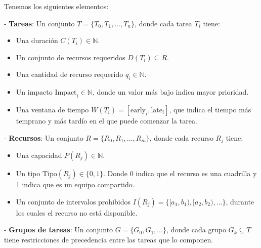 \documentclass{article}
\begin{document}
Tenemos los siguientes elementos:

- \textbf{Tareas}: Un conjunto \( T = \{T_0, T_1, \dots, T_n\} \), donde cada tarea \( T_i \) tiene:
  \begin{itemize}
    \item Una duración \( C(T_i) \in \mathbb{N} \).
    \item Un conjunto de recursos requeridos \( D(T_i) \subseteq R \).
    \item Una cantidad de recurso requerido \( q_i \in \mathbb{N} \).
    \item Un impacto \( \text{Impact}_i \in \mathbb{N} \), donde un valor más bajo indica mayor prioridad.
    \item Una ventana de tiempo \( W(T_i) = [\text{early}_i, \text{late}_i] \), que indica el tiempo más temprano y más tardío en el que puede comenzar la tarea.
  \end{itemize}

- \textbf{Recursos}: Un conjunto \( R = \{R_0, R_1, \dots, R_m\} \), donde cada recurso \( R_j \) tiene:
  \begin{itemize}
    \item Una capacidad \( P(R_j) \in \mathbb{N} \).
    \item Un tipo \( \text{Tipo}(R_j) \in \{0, 1\} \). Donde 0 indica que el recurso es una cuadrilla y 1 indica que es un equipo compartido. 
    \item Un conjunto de intervalos prohibidos \( I(R_j) = \{[a_1, b_1), [a_2, b_2), \dots\} \), durante los cuales el recurso no está disponible.
  \end{itemize}

- \textbf{Grupos de tareas}: Un conjunto \( G = \{G_0, G_1, \dots\} \), donde cada grupo \( G_k \subseteq T \) tiene restricciones de precedencia entre las tareas que lo componen.

\vspace{0.5cm}
\end{document}
